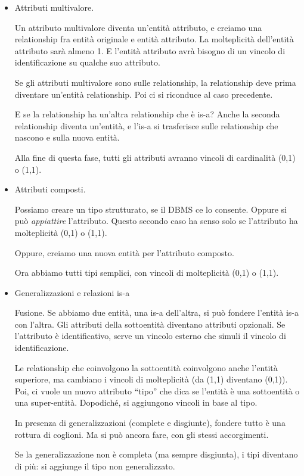 \begin{itemize}
    \item Attributi multivalore.

    Un attributo multivalore diventa un'entit\`a attributo, e creiamo una relationship fra entit\`a originale e entit\`a attributo. La molteplicit\`a dell'entit\`a attributo sar\`a almeno 1. E l'entit\`a attributo avr\`a bisogno di un vincolo di identificazione su qualche suo attributo.

    Se gli attributi multivalore sono sulle relationship, la relationship deve prima diventare un'entit\`a relationship. Poi ci si riconduce al caso precedente.

    E se la relationship ha un'altra relationship che \`e is-a? Anche la seconda relationship diventa un'entit\`a, e l'is-a si trasferisce sulle relationship che nascono e sulla nuova entit\`a.

    Alla fine di questa fase, tutti gli attributi avranno vincoli di cardinalit\`a (0,1) o (1,1).
    \item Attributi composti.

    Possiamo creare un tipo strutturato, se il DBMS ce lo consente. Oppure si pu\`o \emph{appiattire} l'attributo. Questo secondo caso ha senso solo se l'attributo ha molteplicit\`a (0,1) o (1,1).

    Oppure, creiamo una nuova entit\`a per l'attributo composto. 

    Ora abbiamo tutti tipi semplici, con vincoli di molteplicit\`a (0,1) o (1,1).
    \item Generalizzazioni e relazioni is-a

    Fusione. Se abbiamo due entit\`a, una is-a dell'altra, si pu\`o fondere l'entit\`a is-a con l'altra. Gli attributi della sottoentit\`a diventano attributi opzionali. Se l'attributo \`e identificativo, serve un vincolo esterno che simuli il vincolo di identificazione.

    Le relationship che coinvolgono la sottoentit\`a coinvolgono anche l'entit\`a superiore, ma cambiano i vincoli di molteplicit\`a (da (1,1) diventano (0,1)). Poi, ci vuole un nuovo attributo ``tipo'' che dica se l'entit\`a \`e una sottoentit\`a o una super-entit\`a. Dopodich\'e, si aggiungono vincoli in base al tipo.

    In presenza di generalizzazioni (complete e disgiunte), fondere tutto \`e una rottura di coglioni. Ma si pu\`o ancora fare, con gli stessi accorgimenti.

    Se la generalizzazione non \`e completa (ma sempre disgiunta), i tipi diventano di pi\`u: si aggiunge il tipo non generalizzato.


\end{itemize}
